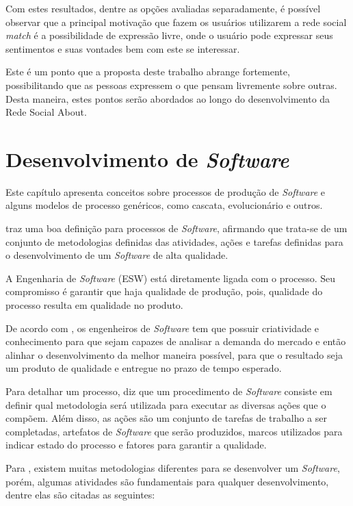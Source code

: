 Com estes resultados, dentre as opções avaliadas separadamente, é possível
observar que a principal motivação que fazem os usuários utilizarem a rede social \textit{match}
é a possibilidade de expressão livre, onde o usuário pode expressar seus sentimentos
e suas vontades bem com este se interessar.

Este é um ponto que a proposta deste trabalho abrange fortemente, possibilitando que
as pessoas expressem o que pensam livremente sobre outras. Desta maneira,
estes pontos serão abordados ao longo do desenvolvimento da Rede Social About.

\section{Desenvolvimento de \textit{Software}}
\label{sec:processo_de_desenvolvimento_de_software}
Este capítulo apresenta conceitos sobre processos de produção de \textit{Software} e alguns modelos de processo genéricos, como cascata, evolucionário e outros.

\cite{pressman2009engenharia} traz uma boa definição para processos de \textit{Software}, afirmando que trata-se de um conjunto de metodologias definidas das atividades, ações e tarefas definidas para o desenvolvimento de um \textit{Software} de alta qualidade.

A Engenharia de \textit{Software} (ESW) está diretamente ligada com o processo. Seu compromisso é garantir que haja qualidade de produção, pois, qualidade do processo resulta em qualidade no produto.

De acordo com \cite{pressman2009engenharia}, os engenheiros de \textit{Software} tem que possuir criatividade e conhecimento para que sejam capazes de analisar a demanda do mercado e então alinhar o desenvolvimento da melhor maneira possível, para que o resultado seja um produto de qualidade e entregue no prazo de tempo esperado.

 Para detalhar um processo, \cite{pressman2009engenharia} diz que um procedimento de \textit{Software} consiste em definir qual metodologia será utilizada para executar as diversas ações que o compõem. Além disso, as ações são um conjunto de tarefas de trabalho a ser completadas, artefatos de \textit{Software} que serão produzidos, marcos utilizados para indicar estado do processo e fatores para garantir a qualidade.

Para \cite{sommerville2011software}, existem muitas metodologias diferentes para se desenvolver um \textit{Software}, porém, algumas atividades são fundamentais para qualquer desenvolvimento, dentre elas são citadas as seguintes:

